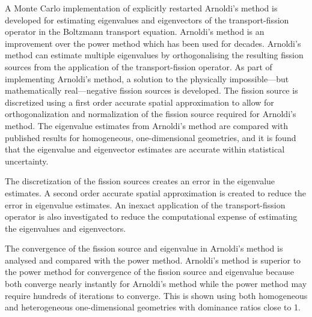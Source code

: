 


\maketitle

\begin{finalabstract}
    A Monte Carlo implementation of explicitly restarted Arnoldi's method is developed for estimating eigenvalues and eigenvectors of the transport-fission operator in the Boltzmann transport equation.  Arnoldi's method is an improvement over the power method which has been used for decades.  Arnoldi's method can estimate multiple eigenvalues by orthogonalising the resulting fission sources from the application of the transport-fission operator.  As part of implementing Arnoldi's method, a solution to the physically impossible---but mathematically real---negative fission sources is developed.  The fission source is discretized using a first order accurate spatial approximation to allow for orthogonalization and normalization of the fission source required for Arnoldi's method.  The eigenvalue estimates from Arnoldi's method are compared with published results for homogeneous, one-dimensional geometries, and it is found that the eigenvalue and eigenvector estimates are accurate within statistical uncertainty.

    The discretization of the fission sources creates an error in the eigenvalue estimates.  A second order accurate spatial approximation is created to reduce the error in eigenvalue estimates.  An inexact application of the transport-fission operator is also investigated to reduce the computational expense of estimating the eigenvalues and eigenvectors.  

    The convergence of the fission source and eigenvalue in Arnoldi's method is analysed and compared with the power method.  Arnoldi's method is superior to the power method for convergence of the fission source and eigenvalue because both converge nearly instantly for Arnoldi's method while the power method may require hundreds of iterations to converge.  This is shown using both homogeneous and heterogeneous one-dimensional geometries with dominance ratios close to 1.
\end{finalabstract}

